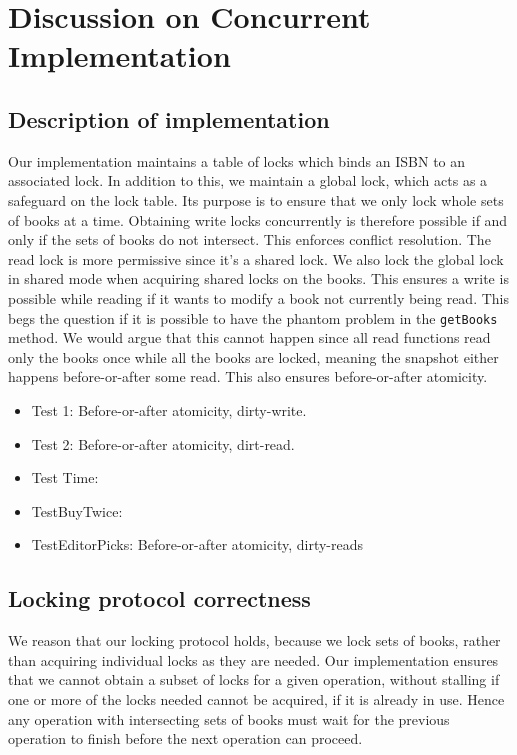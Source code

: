 
\newpage
\section{Discussion on Concurrent Implementation}

\subsection{Description of implementation}
Our implementation maintains a table of locks which binds an ISBN to an
associated lock. In addition to this, we maintain a global lock, which acts as
a safeguard on the lock table. Its purpose is to ensure that we only lock whole
sets of books at a time. Obtaining write locks concurrently is therefore possible
if and only if the sets of books do not intersect. This enforces conflict
resolution. The read lock is more permissive since it's a shared lock. We also lock the global lock in shared mode when acquiring shared locks on the books. This ensures a write is possible while reading if it wants to modify a book not currently being read. This begs the question if it is possible to have the phantom problem in the {\tt getBooks} method. We would argue that this cannot happen since all read functions read only the books once while all the books are locked, meaning the snapshot either happens before-or-after some read. This also ensures before-or-after atomicity.

\begin{itemize}
\item Test 1: Before-or-after atomicity, dirty-write.
\item Test 2: Before-or-after atomicity, dirt-read.
\item Test Time:
\item TestBuyTwice:
\item TestEditorPicks: Before-or-after atomicity, dirty-reads
\end{itemize}

\subsection{Locking protocol correctness}
We reason that our locking protocol holds, because we lock sets of books, rather
than acquiring individual locks as they are needed. Our implementation ensures
that we cannot obtain a subset of locks for a given operation, without stalling
if one or more of the locks needed cannot be acquired, if it is already in use.
Hence any operation with intersecting sets of books must wait for the previous
operation to finish before the next operation can proceed.

